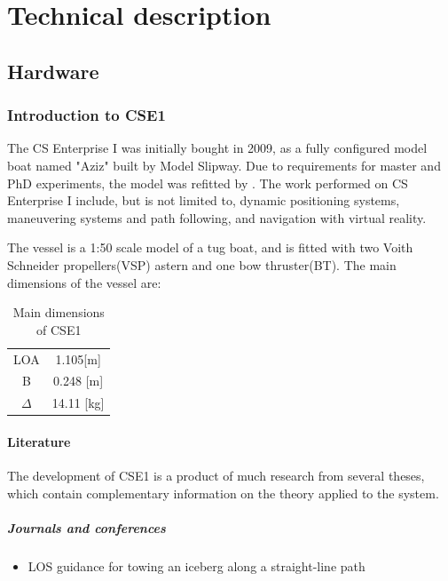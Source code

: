 \part{Technical description}
\chapter{Hardware}
\section{Introduction to CSE1}
The CS Enterprise I was initially bought in 2009, as a fully configured model boat named "Aziz" built by Model Slipway. Due to requirements for master and PhD experiments, the model was refitted by \cite{Skaatun2011}. The work performed on CS Enterprise I include, but is not limited to, dynamic positioning systems, maneuvering systems and path following, and navigation with virtual reality.

The vessel is a 1:50 scale model of a tug boat, and is fitted with two Voith Schneider propellers(VSP) astern and one bow thruster(BT). The main dimensions of the vessel are:
\begin{table}[h!]
	\caption{Main dimensions of CSE1}
	\centering
	\begin{tabular}{cc}
		\hline
		LOA & 1.105[m]\\
		B & 0.248 [m]\\
		$\Delta$ & 14.11 [kg]\\\hline
	\end{tabular}
\end{table}

\subsection{Literature}
The development of CSE1 is a product of much research from several theses, which contain complementary information on the theory applied to the system. 
\subsubsection{Journals and conferences}
\begin{itemize}
	\item LOS guidance for towing an iceberg along a straight-line path \citep{OrstenNorgrenSkjetne2014}
\end{itemize}
